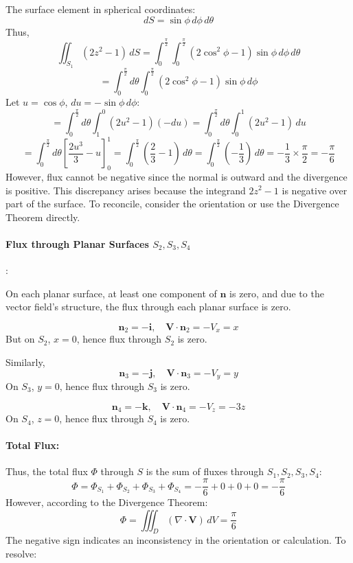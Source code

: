 \documentclass[11pt]{article}
\begin{document}
The surface element in spherical coordinates:
\[
dS = \sin\phi \, d\phi \, d\theta
\]
Thus,
\[
\iint_{S_1} (2z^2 - 1) \, dS = \int_{0}^{\frac{\pi}{2}} \int_{0}^{\frac{\pi}{2}} \left( 2\cos^2\phi - 1 \right) \sin\phi \, d\phi \, d\theta
\]
\[
= \int_{0}^{\frac{\pi}{2}} d\theta \int_{0}^{\frac{\pi}{2}} (2\cos^2\phi - 1) \sin\phi \, d\phi
\]
Let \( u = \cos\phi \), \( du = -\sin\phi \, d\phi \):
\[
= \int_{0}^{\frac{\pi}{2}} d\theta \int_{1}^{0} (2u^2 - 1)(-du) = \int_{0}^{\frac{\pi}{2}} d\theta \int_{0}^{1} (2u^2 - 1) \, du
\]
\[
= \int_{0}^{\frac{\pi}{2}} d\theta \left[ \frac{2u^3}{3} - u \right]_{0}^{1} = \int_{0}^{\frac{\pi}{2}} \left( \frac{2}{3} - 1 \right) \, d\theta = \int_{0}^{\frac{\pi}{2}} \left( -\frac{1}{3} \right) \, d\theta = -\frac{1}{3} \times \frac{\pi}{2} = -\frac{\pi}{6}
\]
However, flux cannot be negative since the normal is outward and the divergence is positive. This discrepancy arises because the integrand \( 2z^2 -1 \) is negative over part of the surface. To reconcile, consider the orientation or use the Divergence Theorem directly.

\paragraph{Flux through Planar Surfaces \( S_2, S_3, S_4 \)}:

On each planar surface, at least one component of \( \mathbf{n} \) is zero, and due to the vector field's structure, the flux through each planar surface is zero.

\[
\mathbf{n}_2 = -\mathbf{i}, \quad \mathbf{V} \cdot \mathbf{n}_2 = -V_x = x
\]
But on \( S_2 \), \( x = 0 \), hence flux through \( S_2 \) is zero.

Similarly,
\[
\mathbf{n}_3 = -\mathbf{j}, \quad \mathbf{V} \cdot \mathbf{n}_3 = -V_y = y
\]
On \( S_3 \), \( y = 0 \), hence flux through \( S_3 \) is zero.

\[
\mathbf{n}_4 = -\mathbf{k}, \quad \mathbf{V} \cdot \mathbf{n}_4 = -V_z = -3z
\]
On \( S_4 \), \( z = 0 \), hence flux through \( S_4 \) is zero.

\paragraph{Total Flux:}

Thus, the total flux \( \Phi \) through \( S \) is the sum of fluxes through \( S_1, S_2, S_3, S_4 \):
\[
\Phi = \Phi_{S_1} + \Phi_{S_2} + \Phi_{S_3} + \Phi_{S_4} = -\frac{\pi}{6} + 0 + 0 + 0 = -\frac{\pi}{6}
\]
However, according to the Divergence Theorem:
\[
\Phi = \iiint_{D} (\nabla \cdot \mathbf{V}) \, dV = \frac{\pi}{6}
\]
The negative sign indicates an inconsistency in the orientation or calculation. To resolve:
\end{document}
